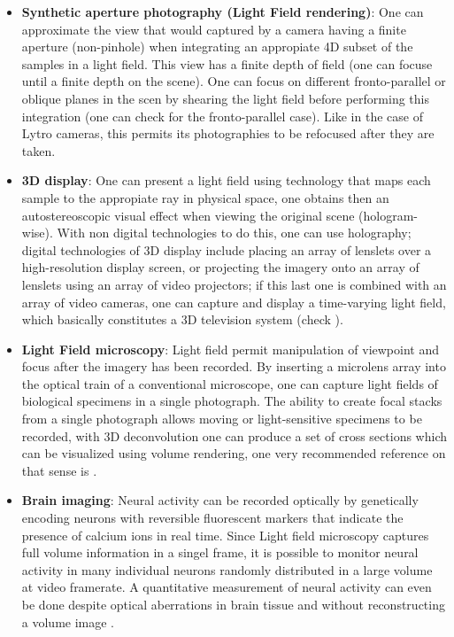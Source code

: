 \begin{itemize}
\item \textbf{Synthetic aperture photography (Light Field rendering)}: One can approximate the view that would captured by a camera having a finite aperture (non-pinhole) when integrating an appropiate 4D subset of the samples in a light field. This view has a finite depth of field (one can focuse until a finite depth on the scene). One can focus on different fronto-parallel or oblique planes in the scen by shearing the light field before performing this integration (one can check \cite{Isaksen} for the fronto-parallel case). Like in the case of Lytro cameras, this permits its photographies to be refocused after they are taken.

\item \textbf{3D display}: One can present a light field using technology that maps each sample to the appropiate ray in physical space, one obtains then an autostereoscopic visual effect when viewing the original scene (hologram-wise). With non digital technologies to do this, one can use holography; digital technologies of 3D display include placing an array of lenslets over a high-resolution display screen, or projecting the imagery onto an array of lenslets using an array of video projectors; if this last one is combined with an array of video cameras, one can capture and display a time-varying light field, which basically constitutes a 3D television system (check \cite{Javidi}).

\item \textbf{Light Field microscopy}: Light field permit manipulation of viewpoint and focus after the imagery has been recorded. By inserting a microlens array into the optical train of a conventional microscope, one can capture light fields of biological specimens in a single photograph. The ability to create focal stacks from a single photograph allows moving or light-sensitive specimens to be recorded, with 3D deconvolution one can produce a set of cross sections which can be visualized using volume rendering, one very recommended reference on that sense is \cite{Ng-micro}.

\item \textbf{Brain imaging}: Neural activity can be recorded optically by genetically encoding neurons with reversible fluorescent markers that indicate the presence of calcium ions in real time. Since Light field microscopy captures full volume information in a singel frame, it is possible to monitor neural activity in many individual neurons randomly distributed in a large volume at video framerate. A quantitative measurement of neural activity can even be done despite optical aberrations in brain tissue and without reconstructing a volume image \cite{Pegard}.


\end{itemize}
